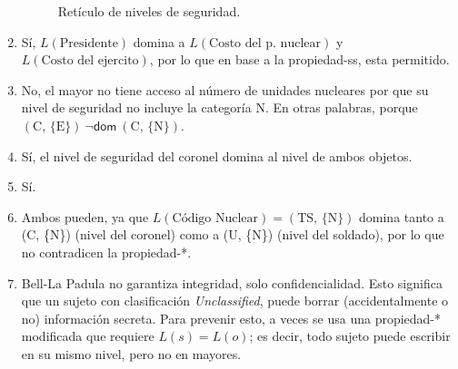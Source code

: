 \documentclass[main.tex]{subfiles}
\begin{document}
\begin{soln}
\begin{enumerate}
\begin{figure}[htp]
  \caption{Retículo de niveles de seguridad.\label{fig:lattice} }
\end{figure}
  \item Sí, $L(\text{Presidente})$ domina a $L(\text{Costo del p.\ nuclear})$ y
    $L(\text{Costo del ejercito})$, por lo que en base a la propiedad-ss, esta
    permitido.
\item No, el mayor no tiene acceso al número de unidades nucleares por que su
  nivel de seguridad no incluye la categoría N. En otras palabras, porque 
  $(\text{C, \{E\}})~\neg\mathsf{dom}~(\text{C, \{N\}})$.
\item Sí, el nivel de seguridad del coronel domina al nivel de ambos objetos.
\item Sí.
\item Ambos pueden, ya que $L(\text{Código Nuclear}) = (\text{TS, \{N\}})$
  domina tanto a (C, \{N\}) (nivel del coronel) como a (U, \{N\}) (nivel del
  soldado), por lo que no contradicen la propiedad-*.
\item Bell-La Padula no garantiza integridad, solo confidencialidad. Esto
  significa que un sujeto con clasificación \textit{Unclassified}, puede borrar
  (accidentalmente o no) información secreta. Para prevenir esto, a veces se
  usa una propiedad-* modificada que requiere $L(s) = L(o)$; es decir, todo
  sujeto puede escribir en su mismo nivel, pero no en mayores.
\end{enumerate}
\end{soln}
\end{document}

